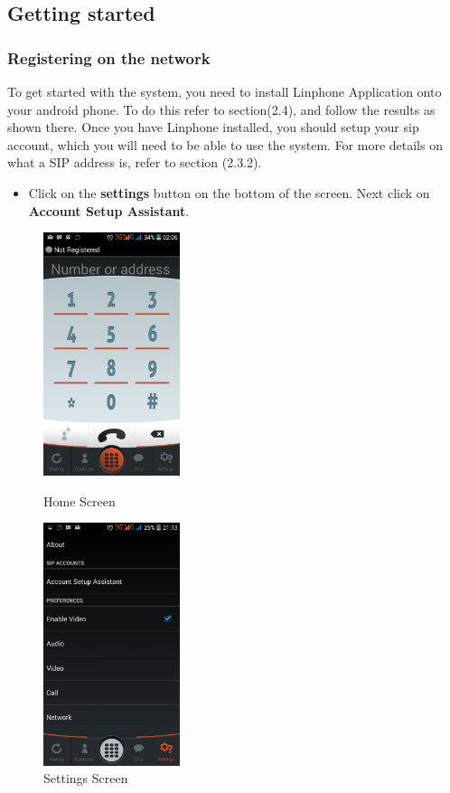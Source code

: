 \documentclass[a4paper]{article}
\begin{document}
\newpage

\subsection{Getting started}
\subsubsection{Registering on the network}
To get started with the system, you need to install Linphone Application onto your android phone. To do this refer to section(2.4), and follow the results as shown there.
Once you have Linphone installed, you should setup your sip account, which you will need to be able to use the system. For more details on what a SIP address is, refer to section (2.3.2).
\begin{itemize}
\item Click on the \textbf{settings} button on the bottom of the screen. Next click on  \textbf{Account Setup Assistant}.
\end{itemize}

\begin{figure}[h]
  \centering
  \begin{minipage}[h]{0.4\textwidth}
    \includegraphics[width=40mm, scale=0.5]{pictures/home.png}
    \caption{Home Screen}
  \end{minipage}
  \hfill
  \begin{minipage}[h]{0.4\textwidth}
    \includegraphics[width=40mm, scale=0.5]{pictures/settings.png}
    \caption{Settings Screen}
  \end{minipage}
\end{figure}
\end{document}
